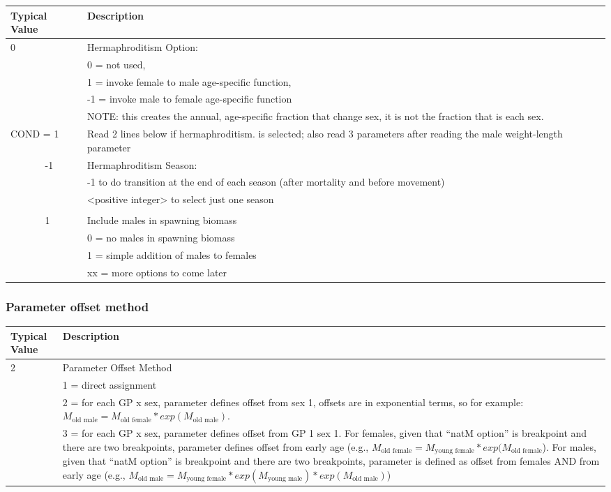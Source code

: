 \begin{longtable}{p{0.5cm} p{2cm} p{12cm}}
	  \multicolumn{2}{l}{Typical Value} & Description \\
	  \hline
	  0 & & Hermaphroditism Option:\\
	   &  & 0 = not used, \\
	   &  & 1 = invoke female to male age-specific function, \\
	   &  & -1 = invoke male to female age-specific function \\
	   &  & NOTE:  this creates the annual, age-specific fraction that change sex, it is not the fraction that is each sex.\\
	  \hline

	  \multicolumn{2}{l}{COND = 1}& Read 2 lines below if hermaphroditism. is selected; also read 3 parameters after reading the male weight-length parameter\\
	  & -1 & Hermaphroditism Season: \\
	  &    & -1 to do transition at the end of each season (after mortality and before movement)\\
	  &    & <positive integer> to select just one season\\
	  \\
	  & 1  & Include males in spawning biomass \\
	  &    & 0 = no males in spawning biomass \\
	  &    & 1 = simple addition of males to females\\
	  &    & xx = more options to come later \\
	  \hline
	\end{longtable}

\pagebreak
\subsubsection{Parameter offset method}

\begin{longtable}{p{0.5cm} p{2cm} p{12cm}}
	\multicolumn{2}{l}{Typical Value} & Description \\
	\hline
	  2 & & Parameter Offset Method \\
	    & & 1 = direct assignment \\
	    & & 2 = for each GP x sex, parameter defines offset from sex 1, offsets are in exponential terms, so for example: $M_{\text{old male}} = M_{\text{old female}}*exp(M_{\text{old male}})$. \\
	    & & 3 = for each GP x sex, parameter defines offset from GP 1 sex 1.  For females, given that “natM option” is breakpoint and there are two breakpoints, parameter defines offset from early age (e.g., $M_{\text{old female}} = M_{\text{young female}}*exp(M_{\text{old female}}$). For males, given that “natM option” is breakpoint and there are two breakpoints, parameter is defined as offset from females AND from early age (e.g., $M_{\text{old male}} = M_{\text{young female}}*exp(M_{\text{young male}})*exp(M_{\text{old male}})$)\\
	 \hline
\end{longtable}


